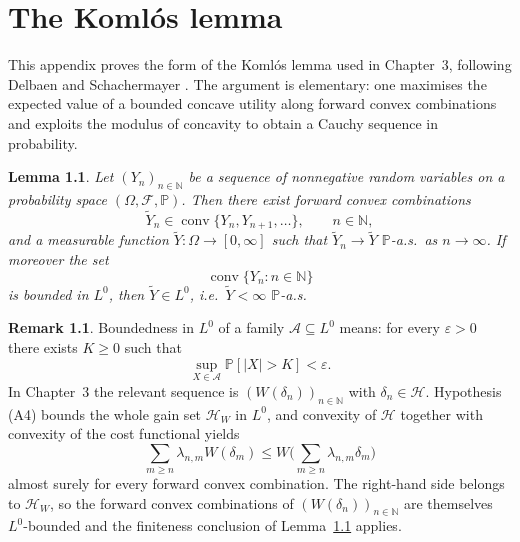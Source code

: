 \documentclass[11pt,a4paper]{report}
\numberwithin{equation}{chapter}
\theoremstyle{plain}
\newtheorem{lemma}[proposition]{Lemma}
\theoremstyle{definition}
\newtheorem{remark}[proposition]{Remark}
\newcommand{\PP}{\mathbb{P}}
\newcommand{\N}{\mathbb{N}}
\newcommand{\F}{\mathcal{F}}
\newcommand{\HH}{\mathcal{H}}
\begin{document}
\appendix

\chapter{The Koml\'os lemma}

This appendix proves the form of the Koml\'os lemma used in Chapter~3, following Delbaen and Schachermayer \cite[Lemma~A1.1]{delbaenschachermayer}. The argument is elementary: one maximises the expected value of a bounded concave utility along forward convex combinations and exploits the modulus of concavity to obtain a Cauchy sequence in probability.

\begin{lemma}\label{lem:komlos}
    Let $(Y_n)_{n\in\N}$ be a sequence of nonnegative random variables on a probability space $(\Omega,\F,\PP)$. Then there exist forward convex combinations
    \[
        \widetilde Y_n\in\operatorname{conv}\{Y_n,Y_{n+1},\dots\},\qquad n\in\N,
    \]
    and a measurable function $\widetilde Y\colon\Omega\to[0,\infty]$ such that $\widetilde Y_n\to\widetilde Y$ $\PP$-a.s.\ as $n\to\infty$. If moreover the set
    \[
        \operatorname{conv}\{Y_n:n\in\N\}
    \]
    is bounded in $L^0$, then $\widetilde Y\in L^0$, i.e.\ $\widetilde Y<\infty$ $\PP$-a.s.
\end{lemma}

\begin{remark}
    Boundedness in $L^0$ of a family $\mathcal{A}\subseteq L^0$ means: for every $\varepsilon>0$ there exists $K\ge0$ such that
    \[
        \sup_{X\in\mathcal{A}}\PP[|X|>K]<\varepsilon.
    \]
    In Chapter~3 the relevant sequence is $(W(\delta_n))_{n\in\N}$ with $\delta_n\in\HH$. Hypothesis (A4) bounds the whole gain set $\HH_W$ in $L^0$, and convexity of $\HH$ together with convexity of the cost functional yields
    \[
        \sum_{m\ge n}\lambda_{n,m}W(\delta_m)\le W\bigg(\sum_{m\ge n}\lambda_{n,m}\delta_m\bigg)
    \]
    almost surely for every forward convex combination. The right-hand side belongs to $\HH_W$, so the forward convex combinations of $(W(\delta_n))_{n\in\N}$ are themselves $L^0$-bounded and the finiteness conclusion of Lemma~\ref{lem:komlos} applies.
\end{remark}
\end{document}
